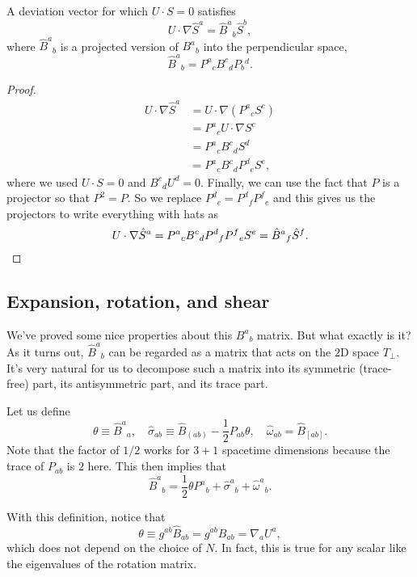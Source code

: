 \begin{prop}
    A deviation vector for which $U\cdot S=0$ satisfies
    \begin{equation}
        U\cdot \nabla \hat S^a = \hat B^a{}_b \hat S^b,
    \end{equation}
    where $\hat B^a{}_b$ is a projected version of $B^a{}_b$ into the perpendicular space,
    \begin{equation}
        \hat B^a{}_b=P^a{}_c B^c{}_d P_b{}^d.
    \end{equation}
\end{prop}
\begin{proof}
    \begin{align*}
        U\cdot \nabla \hat S^a &= U\cdot \nabla(P^a{}_c S^c)\\
            &= P^a{}_c U\cdot \nabla S^c\\
            &= P^a{}_c B^c{}_d S^d\\
            &= P^a{}_c B^c{}_d P^d{}_e S^e,
    \end{align*}
    where we used $U\cdot S=0$ and $B^c{}_d U^d=0$. Finally, we can use the fact that $P$ is a projector so that $P^2=P$. So we replace $P^d{}_e=P^d{}_f P^f{}_e$ and this gives us the projectors to write everything with hats as
    \begin{equation*}
        U\cdot \nabla \hat S^a = P^a{}_c B^c{}_d P^d{}_f P^f{}_e S^e = \hat B^a{}_f \hat S^f. \qedhere
    \end{equation*}
\end{proof}

\subsection*{Expansion, rotation, and shear}
We've proved some nice properties about this $B^a{}_b$ matrix. But what exactly is it? As it turns out, $\hat B^a{}_b$ can be regarded as a matrix that acts on the $2$D space $T_\perp$. It's very natural for us to decompose such a matrix into its symmetric (trace-free) part, its antisymmetric part, and its trace part.
\begin{defn}
    Let us define
    \begin{equation}
        \theta \equiv \hat B^a{}_a, \quad \hat \sigma_{ab} \equiv \hat B_{(ab)}-\frac{1}{2} P_{ab} \theta, \quad \hat \omega_{ab} = \hat B_{[ab]}.
    \end{equation}
    Note that the factor of $1/2$ works for $3+1$ spacetime dimensions because the trace of $P_{ab}$ is $2$ here. This then implies that
    \begin{equation}
        \hat B^a{}_b = \frac{1}{2} \theta P^a{}_b +\hat \sigma^a{}_b +\hat \omega^a{}_b.
    \end{equation}
\end{defn}
With this definition, notice that
\begin{equation}
    \theta \equiv g^{ab} \hat B_{ab} = g^{ab} B_{ab} =\nabla_a U^a,
\end{equation}
which does not depend on the choice of $N$. In fact, this is true for any scalar like the eigenvalues of the rotation matrix.

